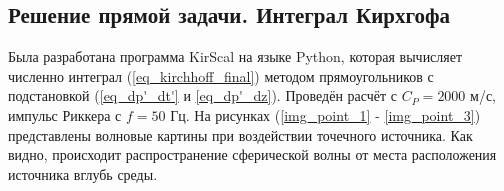 \documentclass{article}
\begin{document}
\subsection{Решение прямой задачи. Интеграл Кирхгофа}

Была разработана программа KirScal на языке Python, которая вычисляет численно интеграл (\ref{eq_kirchhoff_final}) методом прямоугольников с подстановкой (\ref{eq_dp'_dt'} и \ref{eq_dp'_dz}).
Проведён расчёт с $C_P = 2000$ м/с, импульс Риккера с $f = 50$ Гц.
На рисунках (\ref{img_point_1} - \ref{img_point_3}) представлены волновые картины при воздействии точечного источника.
Как видно, происходит распространение сферической волны от места расположения источника вглубь среды.

\noindent
\begin{minipage}{\linewidth}
\label{img_point_1}
\end{minipage}

\noindent
\begin{minipage}{\linewidth}
\label{img_point_2}
\end{minipage}
\end{document}
